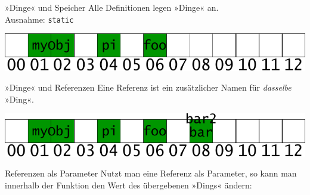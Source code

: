 \begin{frame}[fragile]{»Dinge« und Speicher}
	Alle Definitionen legen »Dinge« an.\\
	{\tiny Ausnahme: \verb|static|}
	
	{\footnotesize
	\begin{block}{}
		
	\end{block}
	}
	
	\pause
	\vspace{1em}
	
	\includegraphics[width=\linewidth]{images/object_things}
\end{frame}

\begin{frame}[fragile]{»Dinge« und Referenzen}
	Eine Referenz ist ein zusätzlicher Namen für \emph{dasselbe} »Ding«.
	
	{\footnotesize
	\begin{block}{}
		
	\end{block}
	}
	
	\pause
	\vspace{1em}
	
	\includegraphics[width=\linewidth]{images/object_refs}
\end{frame}

\begin{frame}[fragile]{Referenzen als Parameter}
	Nutzt man eine Referenz als Parameter, so kann man innerhalb der Funktion den Wert des übergebenen »Dings« ändern:
	
	{\footnotesize
	\begin{block}{}
		
	\end{block}
	}
	
	\pause
	
	{\footnotesize
	\begin{block}{}
		
	\end{block}
	}
\end{frame}


